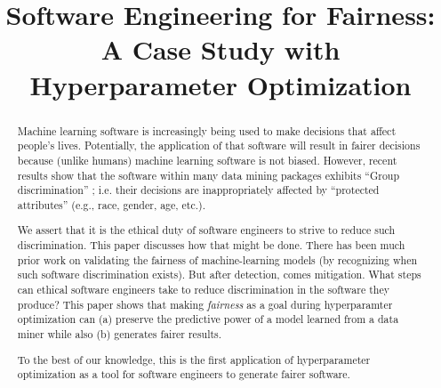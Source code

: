 \documentclass[10pt,conference]{IEEEtran}
\begin{document}
\title{Software Engineering for Fairness: A Case Study with Hyperparameter Optimization}

\author{}



\maketitle
\thispagestyle{plain}
\pagestyle{plain}

\begin{abstract}
Machine learning software is increasingly being used to make decisions that affect people's lives.  Potentially,  the application of that software will result in fairer decisions because (unlike humans) machine learning software is not biased. However, recent results show that the software within many data mining packages exhibits ``Group discrimination'' ; i.e. their decisions are  inappropriately affected by   “protected attributes” (e.g., race, gender, age, etc.).

We assert that it is the ethical duty of software engineers to strive to reduce such discrimination.  This paper discusses how that might be done.  There has been much prior work  on validating the fairness of machine-learning models (by recognizing when such software discrimination exists). But after detection, comes mitigation. What steps can ethical software engineers take to reduce discrimination in the software they produce?  This paper shows that making \textit{fairness} as a goal during hyperparamter optimization can (a) preserve the predictive power of a model learned from a data miner while also (b) generates fairer results.

To the best of  our knowledge, this is the first application  of hyperparameter optimization as a tool for software engineers to generate fairer software.
\end{abstract}
\end{document}
